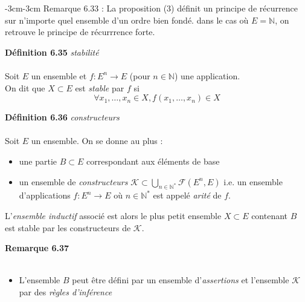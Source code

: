 \documentclass{article}
\newcommand{\notion}[1]{\textcolor{vert_fonce}{\textit{#1}}}
\newenvironment{definition}[2]
{
    \begin{boite_definition}
    \textbf{\textcolor{rouge_fonce}{Définition #1}} \textit{#2} \\ \\
}
{
    \end{boite_definition}
    \vspace{15pt}
}
\newenvironment{exemple}[2]
{
    \begin{boite_exemple}
    \textbf{\textcolor{bleu_fonce}{Exemple #1}} \textit{#2} \\
    \begin{itemize}[label=$\blacktriangleright \quad $]                    
}
{   
    \end{itemize}
    \end{boite_exemple}
    \vspace{15pt}
}
\newenvironment{remarque}[2]
{
    \begin{boite_remarque}
    \textbf{\textcolor{bleu_fonce}{Remarque #1}}\textit{#2} \\ \\
    \begin{itemize}[label=$\blacktriangleright \quad $ ]                    
}
{   
    \end{itemize}
    \end{boite_remarque}
    
}
\begin{document}
\begin{adjustwidth}{-3cm}{-3cm}
        Remarque 6.33 : 
        La proposition (3) définit un principe de récurrence sur n'importe quel ensemble d'un ordre bien fondé. dans le cas où $E = \mathbb{N}$, on retrouve le principe de récurrrence forte.

                

        \begin{definition}{6.35}{stabilité}
            Soit $E$ un ensemble et $f:E^n \rightarrow E$ (pour $n \in \mathbb{N}$) une application. \\ On dit que $X \subset E$ est \notion{stable} par $f$ si $$ \forall x_1,\ldots,x_n \in X, f(x_1,\ldots,x_n) \in X$$
        \end{definition}

        \begin{definition}{6.36}{constructeurs}
            Soit $E$ un ensemble. On se donne au plus :  \begin{itemize}
                \item une partie $B \subset E$ correspondant aux éléments de base
                \item un ensemble de \notion{constructeurs} $\mathcal{K} \subset \bigcup_{n \in \mathbb{N}^*} \mathcal{F}(E^n,E)$ i.e. un ensemble d'applications $f:E^n \rightarrow E$
                où $n \in \mathbb{N}^*$ est appelé \notion{arité} de $f$.
            \end{itemize}
        L'\notion{ensemble inductif} associé est alors le plus petit ensemble $X \subset E$ contenant $B$ est stable par les constructeurs de $\mathcal{K}$.
        \end{definition}

        \begin{remarque}{6.37}{}
            \item L'ensemble $B$ peut être défini par un ensemble d'\notion{assertions} et l'ensemble $\mathcal{K}$ par des \notion{règles d'inférence}
        \end{remarque}


\end{adjustwidth}
\end{document}
